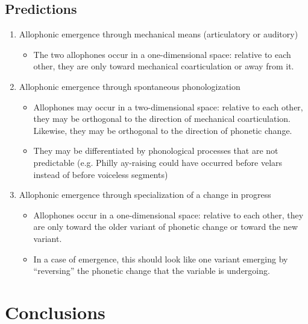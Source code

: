 \subsection{Predictions}
\begin{enumerate}
\item Allophonic emergence through mechanical means (articulatory or auditory)
	\begin{itemize}
		\item The two allophones occur in a one-dimensional space: relative to each other, they are only toward mechanical coarticulation or away from it.
	\end{itemize}
\item Allophonic emergence through spontaneous phonologization
	\begin{itemize}
		\item Allophones may occur in a two-dimensional space: relative to each other, they may be orthogonal to the direction of mechanical coarticulation. Likewise, they may be orthogonal to the direction of phonetic change.
		\item They may be differentiated by phonological processes that are not predictable (e.g. Philly ay-raising could have occurred before velars instead of before voiceless segments)
	\end{itemize}
\item Allophonic emergence through specialization of a change in progress
	\begin{itemize}
		\item Allophones occur in a one-dimensional space: relative to each other, they are only toward the older variant of phonetic change or toward the new variant.
		\item In a case of emergence, this should look like one variant emerging by ``reversing'' the phonetic change that the variable is undergoing.
	\end{itemize}
\end{enumerate}

\section{Conclusions}






